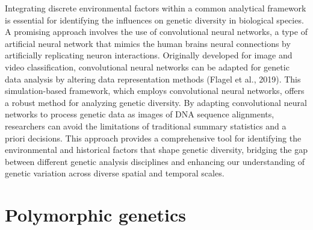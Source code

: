 \documentclass[
]{article}
\begin{document}
Integrating discrete environmental factors within a common analytical
framework is essential for identifying the influences on genetic
diversity in biological species. A promising approach involves the use
of convolutional neural networks, a type of artificial neural network
that mimics the human brain\textquotesingle s neural connections by
artificially replicating neuron interactions. Originally developed for
image and video classification, convolutional neural networks can be
adapted for genetic data analysis by altering data representation
methods (Flagel et al., 2019). This simulation-based framework, which
employs convolutional neural networks, offers a robust method for
analyzing genetic diversity. By adapting convolutional neural networks
to process genetic data as images of DNA sequence alignments,
researchers can avoid the limitations of traditional summary statistics
and a priori decisions. This approach provides a comprehensive tool for
identifying the environmental and historical factors that shape genetic
diversity, bridging the gap between different genetic analysis
disciplines and enhancing our understanding of genetic variation across
diverse spatial and temporal scales.

\hypertarget{polymorphic-genetics}{%
\section{Polymorphic genetics}\label{polymorphic-genetics}}
\end{document}
